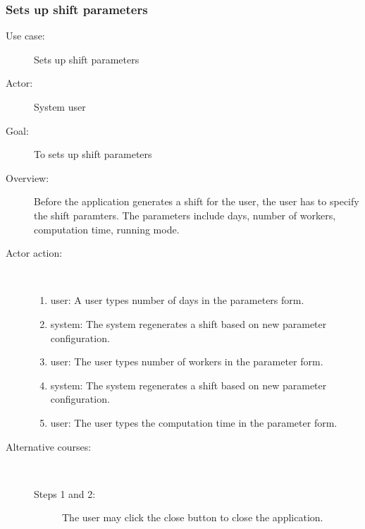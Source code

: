 \documentclass[11pt, oneside]{article}   	%
\begin{document}
\subsubsection{Sets up shift parameters}
\begin{description}
\item[Use case:] Sets up shift parameters
\item[Actor:] System user
\item[Goal:] To sets up shift parameters
\item[Overview:] Before the application generates a shift for the user, the user has to specify the shift paramters.
The parameters include days, number of workers, computation time, running mode.
\item[Actor action:]
\
\begin{enumerate}
\item user: A user types number of days in the parameters form.
\item system: The system regenerates a shift based on new parameter configuration.
\item user: The user types number of workers in the parameter form.
\item system: The system regenerates a shift based on new parameter configuration.
\item user: The user types the computation time in the parameter form.
\end{enumerate}

\item[Alternative courses:]
\
\begin{description}
\item[Steps 1 and 2:] The user may click the close button to close the application.
\end{description}

\end{description}
\end{document}
